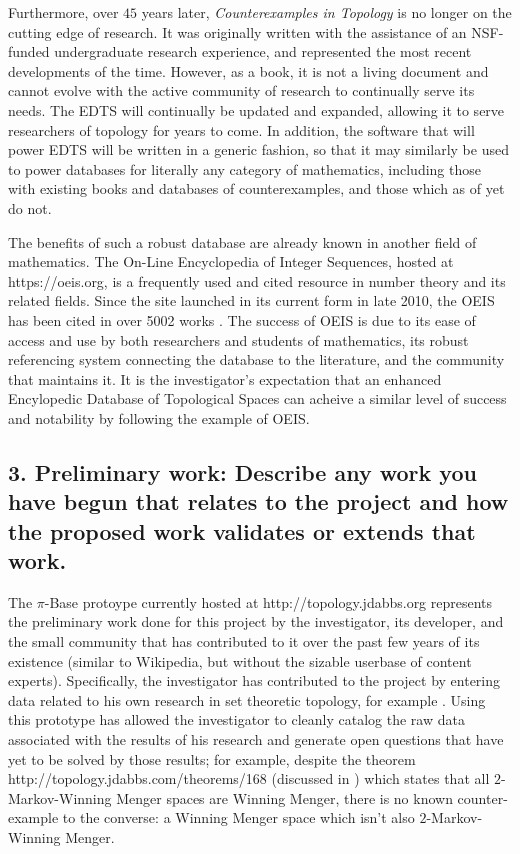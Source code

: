 \documentclass[11pt]{article}
\begin{document}
Furthermore, over \(45\) years later, \textit{Counterexamples in Topology}
is no longer on the cutting edge of research. It was originally written with
the assistance of an NSF-funded undergraduate research experience, and
represented the most recent developments of the time. However, as a book,
it is not a living document and cannot evolve with the active community of
research to continually serve its needs. The EDTS will continually be updated
and expanded, allowing it to serve researchers of topology for years to come.
In addition, the software that will power EDTS will be written in a generic
fashion, so that it may similarly be used to power databases for literally
any category of mathematics, including those with existing books and databases
of counterexamples, and those which as of yet do not.

The benefits of such a robust database are already known in another field of
mathematics. The On-Line Encyclopedia of Integer Sequences, hosted at
https://oeis.org, is a frequently used and cited resource in number theory
and its related fields.
Since the site launched in its current form in late 2010, the OEIS
has been cited in over 5002 works \cite{OEIScitations}. The success of OEIS
is due to its ease of access and use by both researchers and students of
mathematics, its robust referencing system connecting the database to the
literature, and the community that maintains it. It is the investigator's
expectation that an enhanced Encylopedic Database of Topological Spaces can
acheive a similar level of success and notability by following the example
of OEIS.







\subsection*{3. Preliminary work:  Describe any work you have begun that relates to the project and how the proposed work validates or extends that work.}

The \(\pi\)-Base protoype currently hosted at http://topology.jdabbs.org
represents the preliminary work done for this project by the investigator,
its developer, and the small community that has contributed to it
over the past few years of its existence (similar to Wikipedia, but without
the sizable userbase of content experts). Specifically, the investigator
has contributed to the project by entering data related to his own research
in set theoretic topology, for example
\cite{MR3467819,MR3482726,MR3227201,MR3438747}. Using this prototype has
allowed the investigator to cleanly catalog the raw data associated with
the results of his research and generate open questions that have yet to be
solved by those results; for example, despite the theorem
http://topology.jdabbs.com/theorems/168
(discussed in \cite{clontzMengerGamePreprint}) which states that all
\(2\)-Markov-Winning Menger spaces are Winning Menger, there is no known
counter-example to the converse: a Winning Menger space which isn't also
\(2\)-Markov-Winning Menger.
\end{document}
